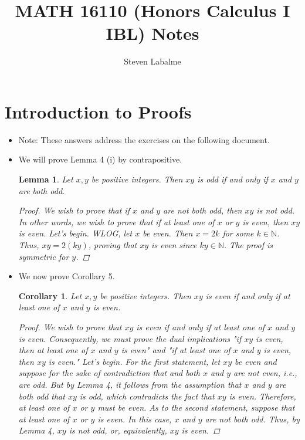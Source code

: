 \documentclass[titlepage]{article}
\title{MATH 16110 (Honors Calculus I IBL) Notes}
\author{Steven Labalme}
\newtheorem{lemma}{Lemma}
\newtheorem{corollary}{Corollary}
\newcommand{\N}{\mathbb{N}}
\begin{document}
\maketitle



\tableofcontents
\newpage



\pagestyle{main}
\renewcommand{\sectionmark}[1]{\markboth{#1}{}}
\section{Introduction to Proofs}
\begin{itemize}
    \item {}Note: These answers address the exercises on the following document.
    \item We will prove Lemma 4 (i) by contrapositive.
    \setcounter{lemma}{3}
    \begin{lemma}
        Let $x,y$ be positive integers. Then $xy$ is odd if and only if $x$ and $y$ are both odd.
        \begin{proof}
            We wish to prove that if $x$ and $y$ are not both odd, then $xy$ is not odd. In other words, we wish to prove that if at least one of $x$ or $y$ is even, then $xy$ is even. Let's begin. WLOG, let $x$ be even. Then $x=2k$ for some $k\in\N$. Thus, $xy=2(ky)$, proving that $xy$ is even since $ky\in\N$. The proof is symmetric for $y$.
        \end{proof}
    \end{lemma}
    \item We now prove Corollary 5.
    \setcounter{corollary}{4}
    \begin{corollary}
        Let $x,y$ be positive integers. Then $xy$ is even if and only if at least one of $x$ and $y$ is even.
        \begin{proof}
            We wish to prove that $xy$ is even if and only if at least one of $x$ and $y$ is even. Consequently, we must prove the dual implications "if $xy$ is even, then at least one of $x$ and $y$ is even" and "if at least one of $x$ and $y$ is even, then $xy$ is even." Let's begin. For the first statement, let $xy$ be even and suppose for the sake of contradiction that and both $x$ and $y$ are not even, i.e., are odd. But by Lemma 4, it follows from the assumption that $x$ and $y$ are both odd that $xy$ is odd, which contradicts the fact that $xy$ is even. Therefore, at least one of $x$ or $y$ must be even. As to the second statement, suppose that at least one of $x$ or $y$ is even. In this case, $x$ and $y$ are not both odd. Thus, by Lemma 4, $xy$ is not odd, or, equivalently, $xy$ is even.

\end{proof}
\end{corollary}
\end{itemize}
\end{document}
